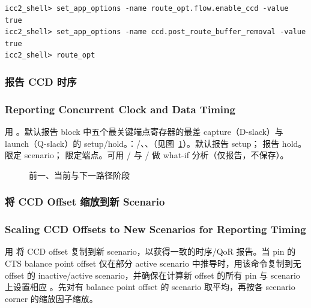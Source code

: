 \begin{lstlisting}
icc2_shell> set_app_options -name route_opt.flow.enable_ccd -value true
icc2_shell> set_app_options -name ccd.post_route_buffer_removal -value true
icc2_shell> route_opt
\end{lstlisting}

\subsubsection{报告 CCD 时序}
\subsubsection*{Reporting Concurrent Clock and Data Timing}

用 。默认报告 block 中五个最关键端点寄存器的最差 capture（D-slack）与 launch（Q-slack）的 setup/hold。：/、、（见图~\ref{fig:cts-ccd-stages}）。默认报告 setup； 报告 hold。 限定 scenario； 限定端点。可用 / 与 / 做 what-if 分析（仅报告，不保存）。

\begin{figure}[htbp]
\centering
{}
\caption{前一、当前与下一路径阶段}
\label{fig:cts-ccd-stages}
\end{figure}

\subsubsection{将 CCD Offset 缩放到新 Scenario}
\subsubsection*{Scaling CCD Offsets to New Scenarios for Reporting Timing}

用  将 CCD offset 复制到新 scenario，以获得一致的时序/QoR 报告。当 pin 的 CTS balance point offset 仅在部分 active scenario 中推导时，用该命令复制到无 offset 的 inactive/active scenario，并确保在计算新 offset 的所有 pin 与 scenario 上设置相应 。先对有 balance point offset 的 scenario 取平均，再按各 scenario corner 的缩放因子缩放。

